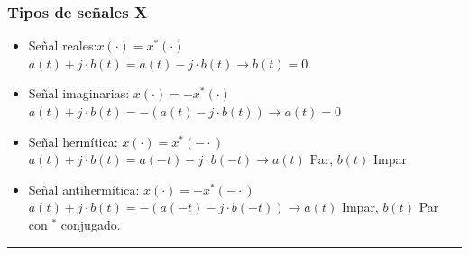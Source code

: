 
\begin{frame}
  \frametitle{Tipos de señales X}
  \vspace{-0.1cm}
  \small
  \begin{itemize}
    \item \alert{Señal reales}:$x(\cdot) = x^*(\cdot)$\\
    \vspace{0.1cm}
    \color{gray} $a(t)+j\cdot b(t)=a(t)-j \cdot b(t) \rightarrow b(t)=0$ \color{black}\\
    \item \alert{Señal imaginarias}: $x(\cdot) = -x^*(\cdot)$
    \vspace{0.1cm}
    \color{gray} $a(t)+j\cdot b(t)=-(a(t)-j \cdot b(t)) \rightarrow a(t)=0$ \color{black}\\
    \item \alert{Señal hermítica}:  $x(\cdot) = x^*(-\cdot)$
    \vspace{0.1cm}
    \color{gray} $a(t)+j\cdot b(t)=a(-t)-j \cdot b(-t) \rightarrow a(t)$ Par, $b(t)$ Impar \color{black}
    \item \alert{Señal antihermítica}: $x(\cdot) = -x^*(-\cdot)$\\
    \vspace{0.1cm}
    \color{gray} $a(t)+j\cdot b(t)=-(a(-t)-j \cdot b(-t)) \rightarrow a(t)$ Impar, $b(t)$ Par \color{black}
    \\ \vspace{0.2cm}
    con $^*$ conjugado.
  \end{itemize}

  \vspace{-0.3cm}
  \rule{10cm}{0.4pt}
  \vspace{0.2cm}\\
  \color{olivegreen}{Vamos a trabajar con señales: 1D (2D) escalares, continuas y discretas, analógicas y muestreadas, deterministas y aleatorias, periódicas y aperiódicas, reales y complejas.}

\end{frame}



